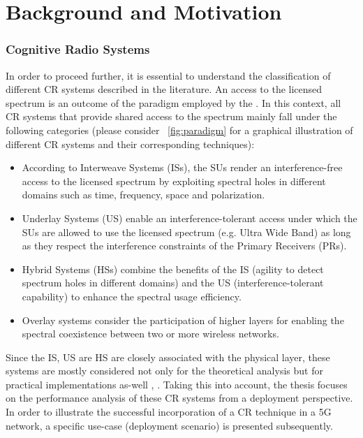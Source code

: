 \section{Background and Motivation}
\label{sec:mot}

\subsubsection*{Cognitive Radio Systems}


In order to proceed further, it is essential to understand the classification of different CR systems described in the literature. An access to the licensed spectrum is an outcome of the paradigm employed by the . In this context, all CR systems that provide shared access to the spectrum mainly fall under the following categories \cite{Goldsmith09} (please consider \figurename~\ref{fig:paradigm} for a graphical illustration of different CR systems and their corresponding techniques): 
\begin{itemize}
\item According to Interweave Systems (ISs), the SUs render an interference-free access to the licensed spectrum by exploiting spectral holes in different domains such as time, frequency, space and polarization. 
\item Underlay Systems (US) enable an interference-tolerant access under which the SUs are allowed to use the licensed spectrum (e.g. Ultra Wide Band) as long as they respect the interference constraints of the Primary Receivers (PRs). 
\item Hybrid Systems (HSs) combine the benefits of the IS (agility to detect spectrum holes in different domains) and the US (interference-tolerant capability) to enhance the spectral usage efficiency.  
\item Overlay systems consider the participation of higher layers for enabling the spectral coexistence between two or more wireless networks. 
\end{itemize}
Since the IS, US are HS are closely associated with the physical layer, these systems are mostly considered not only for the theoretical analysis but for practical implementations as-well , \cite{Cabric04, Cabric06, Kim10}. Taking this into account, the thesis focuses on the performance analysis of these CR systems from a deployment perspective. In order to illustrate the successful incorporation of a CR technique in a 5G network, a specific use-case (deployment scenario) is presented subsequently. 


